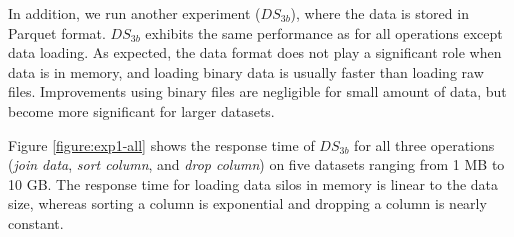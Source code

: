 \documentclass[10pt, a4paper, twocolumn]{article} %
\begin{document}
In addition, we run another experiment ($DS_{3b}$), where the data is stored in Parquet format. $DS_{3b}$ exhibits the same performance as for all operations except data loading. As expected, the data format does not play a significant role when data is in memory, and loading binary data is usually faster than loading raw files.  
Improvements using binary files are negligible for small amount of data, but become more significant for larger datasets.

Figure \ref{figure:exp1-all} shows the response time of $DS_{3b}$ for all three operations (\textit{join data}, \textit{sort column}, and \textit{drop column}) on five datasets ranging from 1 MB to 10 GB.
The response time for loading data silos in memory is linear to the data size, whereas sorting a column is exponential and dropping a column is nearly constant. 
\end{document}
